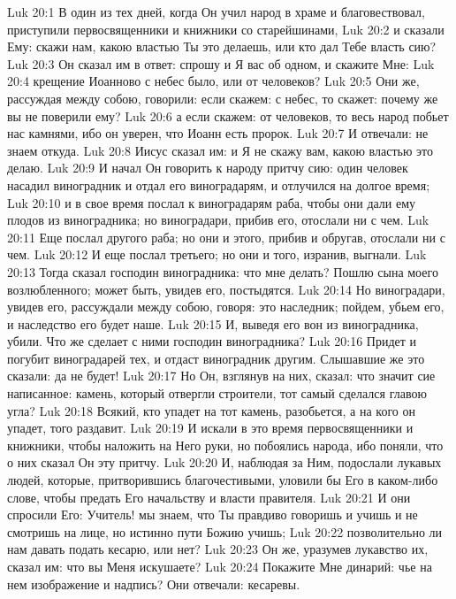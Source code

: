 \vs Luk 20:1 В один из тех дней, когда Он учил народ в храме и благовествовал, приступили первосвященники и книжники со старейшинами,
\vs Luk 20:2 и сказали Ему: скажи нам, какою властью Ты это делаешь, или кто дал Тебе власть сию?
\vs Luk 20:3 Он сказал им в ответ: спрошу и Я вас об одном, и скажите Мне:
\vs Luk 20:4 крещение Иоанново с небес было, или от человеков?
\vs Luk 20:5 Они же, рассуждая между собою, говорили: если скажем: с небес, то скажет: почему же вы не поверили ему?
\vs Luk 20:6 а если скажем: от человеков, то весь народ побьет нас камнями, ибо он уверен, что Иоанн есть пророк.
\vs Luk 20:7 И отвечали: не знаем откуда.
\vs Luk 20:8 Иисус сказал им: и Я не скажу вам, какою властью это делаю.
\rsbpar\vs Luk 20:9 И начал Он говорить к народу притчу сию: один человек насадил виноградник и отдал его виноградарям, и отлучился на долгое время;
\vs Luk 20:10 и в свое время послал к виноградарям раба, чтобы они дали ему плодов из виноградника; но виноградари, прибив его, отослали ни с чем.
\vs Luk 20:11 Еще послал другого раба; но они и этого, прибив и обругав, отослали ни с чем.
\vs Luk 20:12 И еще послал третьего; но они и того, изранив, выгнали.
\vs Luk 20:13 Тогда сказал господин виноградника: что мне делать? Пошлю сына моего возлюбленного; может быть, увидев его, постыдятся.
\vs Luk 20:14 Но виноградари, увидев его, рассуждали между собою, говоря: это наследник; пойдем, убьем его, и наследство его будет наше.
\vs Luk 20:15 И, выведя его вон из виноградника, убили. Что же сделает с ними господин виноградника?
\vs Luk 20:16 Придет и погубит виноградарей тех, и отдаст виноградник другим. Слышавшие же это сказали: да не будет!
\vs Luk 20:17 Но Он, взглянув на них, сказал: что значит сие написанное: камень, который отвергли строители, тот самый сделался главою угла?
\vs Luk 20:18 Всякий, кто упадет на тот камень, разобьется, а на кого он упадет, того раздавит.
\vs Luk 20:19 И искали в это время первосвященники и книжники, чтобы наложить на Него руки, но побоялись народа, ибо поняли, что о них сказал Он эту притчу.
\vs Luk 20:20 И, наблюдая за Ним, подослали лукавых людей, которые, притворившись благочестивыми, уловили бы Его в каком-либо слове, чтобы предать Его начальству и власти правителя.
\vs Luk 20:21 И они спросили Его: Учитель! мы знаем, что Ты правдиво говоришь и учишь и не смотришь на лице, но истинно пути Божию учишь;
\vs Luk 20:22 позволительно ли нам давать подать кесарю, или нет?
\vs Luk 20:23 Он же, уразумев лукавство их, сказал им: что вы Меня искушаете?
\vs Luk 20:24 Покажите Мне динарий: чье на нем изображение и надпись? Они отвечали: кесаревы.
